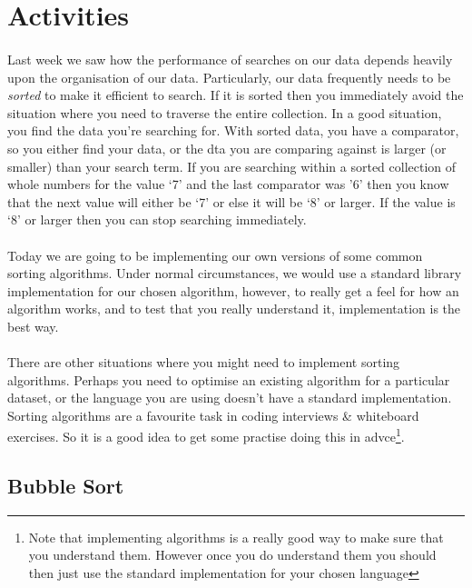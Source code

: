 \documentclass[10pt, a4paper, twosize]{article}
\begin{document}
\section{Activities}

\paragraph{} Last week we saw how the performance of searches on our data depends heavily upon the organisation of our data. Particularly, our data frequently needs to be \emph{sorted} to make it efficient to search. If it is sorted then you immediately avoid the situation where you need to traverse the entire collection. In a good situation, you find the data you're searching for. With sorted data, you have a comparator, so you either find your data, or the dta you are comparing against is larger (or smaller) than your search term. If you are searching within a sorted collection of whole numbers for the value `7' and the last comparator was '6' then you know that the next value will either be `7' or else it will be `8' or larger. If the value is `8' or larger then you can stop searching immediately.

\paragraph{} Today we are going to be implementing our own versions of some common sorting algorithms. Under normal circumstances, we would use a standard library implementation for our chosen algorithm, however, to really get a feel for how an algorithm works, and to test that you really understand it, implementation is the best way.

\paragraph{} There are other situations where you might need to implement sorting algorithms. Perhaps you need to optimise an existing algorithm for a particular dataset, or the language you are using doesn't have a standard implementation. Sorting algorithms are a favourite task in coding interviews \& whiteboard exercises. So it is a good idea to get some practise doing this in advce\footnote{Note that implementing algorithms is a really good way to make sure that you understand them. However once you do understand them you should then just use the standard implementation for your chosen language}.

\subsection{Bubble Sort}
\end{document}
